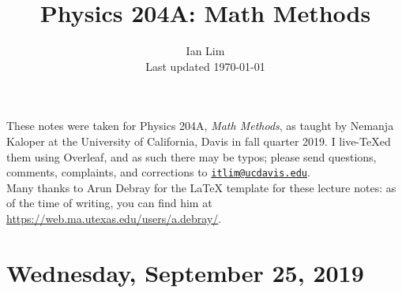 \documentclass{../mynotes}
\begin{document}
\title{Physics 204A: Math Methods}
\author{Ian Lim\\ Last updated \today}
\maketitle
{\small\noindent These notes were taken for Physics 204A, \emph{Math Methods}, as taught by Nemanja Kaloper at the University of California, Davis in fall quarter 2019. I live-\TeX ed them using Overleaf, and as such there may be typos; please send questions, comments, complaints, and corrections to 
\href{mailto:itlim@ucdavis.edu?subject=204A\%20Lecture\%20Notes}{\texttt{itlim@ucdavis.edu}}.\\
Many thanks to Arun Debray for the {\LaTeX} template for these lecture notes: as of the time of writing, you can find him at \url{https://web.ma.utexas.edu/users/a.debray/}.}

\tableofcontents

\section{Wednesday, September 25, 2019}
	
\end{document}
